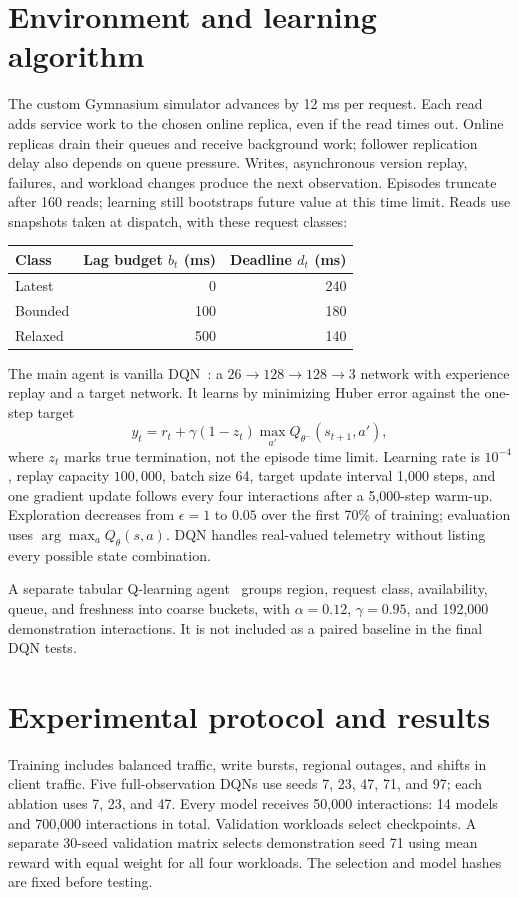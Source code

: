 \documentclass[10pt,a4paper,twocolumn]{article}
\begin{document}
\section{Environment and learning algorithm}
The custom Gymnasium simulator advances by 12 ms per request. Each read adds
service work to the chosen online replica, even if the read times out. Online
replicas drain their queues and receive background work; follower replication
delay also depends on queue pressure. Writes, asynchronous version replay,
failures, and workload changes produce the next observation. Episodes truncate
after 160 reads; learning still bootstraps future value at this time limit.
Reads use snapshots taken at dispatch, with these request classes:
\begin{center}
\small
\begin{tabular}{lrr}
\toprule
Class & Lag budget $b_t$ (ms) & Deadline $d_t$ (ms)\\
\midrule
Latest  & 0   & 240\\
Bounded & 100 & 180\\
Relaxed & 500 & 140\\
\bottomrule
\end{tabular}
\end{center}

The main agent is vanilla DQN~\cite{dqn,sb3}: a
$26\!\rightarrow\!128\!\rightarrow\!128\!\rightarrow\!3$ network with
experience replay and a target network. It learns by minimizing Huber error
against the one-step target
\[
 y_t=r_t+\gamma(1-z_t)\max_{a'}Q_{\theta^-}(s_{t+1},a'),
\]
where $z_t$ marks true termination, not the episode time limit.
Learning rate is $10^{-4}$, replay capacity $100{,}000$, batch size 64, target
update interval 1,000 steps, and one gradient update follows every four
interactions after a 5,000-step warm-up. Exploration decreases from
$\epsilon=1$ to $0.05$ over the first 70\% of training; evaluation uses
$\arg\max_a Q_{\theta}(s,a)$. DQN handles real-valued telemetry without
listing every possible state combination.

A separate tabular Q-learning agent~\cite{qlearning} groups region,
request class, availability, queue, and freshness into coarse buckets, with
$\alpha=0.12$, $\gamma=0.95$, and 192,000 demonstration interactions. It is
not included as a paired baseline in the final DQN tests.

\clearpage %
\section{Experimental protocol and results}
Training includes balanced traffic, write bursts, regional outages, and shifts
in client traffic. Five full-observation DQNs use seeds
7, 23, 47, 71, and 97; each ablation uses 7, 23, and 47. Every model receives 50,000
interactions: 14 models and 700,000 interactions in total. Validation workloads
select checkpoints. A separate 30-seed validation matrix selects demonstration
seed 71 using mean reward with equal weight for all four workloads. The
selection and model hashes are fixed before testing.
\end{document}

